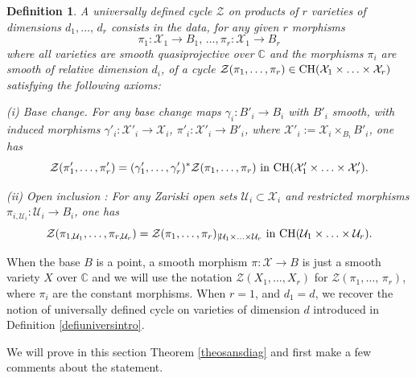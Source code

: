 \documentclass[10pt]{article}
\newtheorem{Defi}[theo]{Definition}
\begin{document}
\begin{Defi}\label{defiaxiom}  A universally defined cycle $\mathcal{Z}$ on products of $r$ varieties of dimensions $d_1,\ldots,\,d_r$ consists in
the data, for any given $r$ morphisms $$\pi_1:\mathcal{X}_1\rightarrow B_1,\,\ldots,\pi_r:\mathcal{X}_1\rightarrow B_r$$
where all varieties are smooth quasiprojective over $\mathbb{C}$ and the morphisms $\pi_i$ are smooth of relative dimension $d_i$, of a cycle $\mathcal{Z}(\pi_1,\ldots,\pi_r)\in {\rm CH}(\mathcal{X}_1\times\ldots\times \mathcal{X}_r)$ satisfying the following axioms:

(i) {\rm Base change}. For any base change maps $\gamma_i: B'_i\rightarrow B_i$ with $B'_i$ smooth,
with induced morphisms $\gamma'_i:\mathcal{X}'_i\rightarrow \mathcal{X}_i$, $\pi'_i:\mathcal{X}'_i\rightarrow B'_i$, where $\mathcal{X}'_i:=\mathcal{X}_i\times_{B_i}B'_i$, one has $$\mathcal{Z}(\pi'_1,\ldots,\pi'_r)=
(\gamma'_1,\ldots,\gamma'_r)^*\mathcal{Z}(\pi_1,\ldots,\pi_r)\,\,{\rm in}\,\, {\rm CH}(\mathcal{X}'_1\times\ldots\times \mathcal{X}'_r).$$

(ii) {\rm Open inclusion} : For any Zariski open sets $\mathcal{U}_i\subset \mathcal{X}_i$ and restricted morphisms
$\pi_{i,\mathcal{U}_i}:\mathcal{U}_i\rightarrow B_i$, one has
$$\mathcal{Z}(\pi_{1,\mathcal{U}_1},\ldots,\pi_{r,\mathcal{U}_r})=
\mathcal{Z}(\pi_1,\ldots,\pi_r)_{\mid \mathcal{U}_1\times\ldots\times \mathcal{U}_r}\,\,{\rm in}\,\, {\rm CH}(\mathcal{U}_1\times\ldots\times \mathcal{U}_r).$$
\end{Defi}

When the base $B$ is a point, a smooth morphism $\pi:\mathcal{X}\rightarrow B$ is just  a smooth variety $X$ over $\mathbb{C}$ and we will use the notation
$\mathcal{Z}(X_1,\ldots,X_r)$ for $\mathcal{Z}(\pi_1,\ldots,\,\pi_r)$, where $\pi_i$ are the constant morphisms.
When $r=1$, and $d_1=d$, we recover    the notion of universally defined cycle on  varieties of dimension $d$ introduced in Definition \ref{defiuniversintro}.

We will prove in this section Theorem \ref{theosansdiag} and first make a few comments about the statement.
\end{document}
